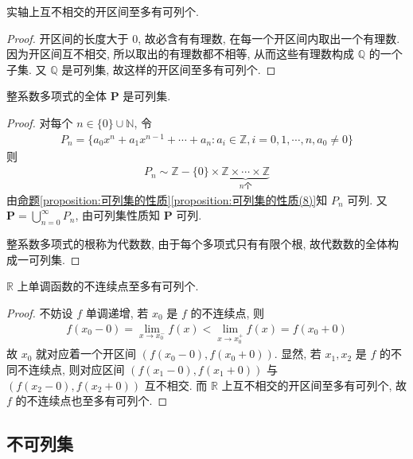 \documentclass[../../main.tex]{subfiles}
\begin{document}
\begin{example}
实轴上互不相交的开区间至多有可列个.
\end{example}
\begin{proof}
开区间的长度大于 $0$, 故必含有有理数, 在每一个开区间内取出一个有理数. 因为开区间互不相交, 所以取出的有理数都不相等, 从而这些有理数构成 $\mathbb{Q}$ 的一个子集. 又 $\mathbb{Q}$ 是可列集, 故这样的开区间至多有可列个.
\end{proof}

\begin{example}
整系数多项式的全体 $\mathbf{P}$ 是可列集.
\end{example}
\begin{proof}
对每个 $n \in \{0\} \cup \mathbb{N}$, 令
\begin{align*}
P_n = \{a_0x^n + a_1x^{n - 1} + \cdots + a_n : a_i \in \mathbb{Z}, i = 0, 1, \cdots, n, a_0 \neq 0\}
\end{align*}
则
\begin{align*}
P_n \sim \mathbb{Z} - \{0\} \times \underbrace{\mathbb{Z} \times \cdots \times \mathbb{Z}}_{n 个}
\end{align*}
由\hyperref[proposition:可列集的性质(8)]{命题\ref{proposition:可列集的性质}\ref{proposition:可列集的性质(8)}}知 $P_n$ 可列. 又 $\mathbf{P} = \bigcup_{n = 0}^{\infty} P_n$, 由可列集性质知 $\mathbf{P}$ 可列.

整系数多项式的根称为代数数, 由于每个多项式只有有限个根, 故代数数的全体构成一可列集.
\end{proof}

\begin{example}
$\mathbb{R}$ 上单调函数的不连续点至多有可列个.
\end{example}
\begin{proof}
不妨设 $f$ 单调递增, 若 $x_0$ 是 $f$ 的不连续点, 则
\begin{align*}
f(x_0 - 0) = \lim_{x \to x_0^-} f(x) < \lim_{x \to x_0^+} f(x) = f(x_0 + 0)
\end{align*}
故 $x_0$ 就对应着一个开区间 $(f(x_0 - 0), f(x_0 + 0))$. 显然, 若 $x_1, x_2$ 是 $f$ 的不同不连续点, 则对应区间 $(f(x_1 - 0), f(x_1 + 0))$ 与 $(f(x_2 - 0), f(x_2 + 0))$ 互不相交. 而 $\mathbb{R}$ 上互不相交的开区间至多有可列个, 故 $f$ 的不连续点也至多有可列个. 
\end{proof}






\subsection{不可列集}
\end{document}
